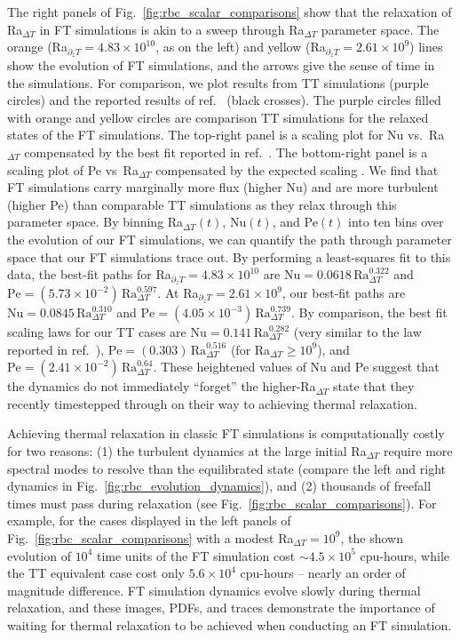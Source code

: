 \documentclass[aps, pre, onecolumn, nofootinbib, notitlepage, groupedaddress, amsfonts, amssymb, amsmath, longbibliography, superscriptaddress]{revtex4-1}
\newcommand{\ea}[1]{{\color{red} #1}}
\begin{document}
The right panels of Fig.~\ref{fig:rbc_scalar_comparisons} show that the relaxation of Ra$_{\Delta T}$ in FT simulations is akin to a sweep through Ra$_{\Delta T}$ parameter space.
The orange (Ra$_{\partial_z T} = 4.83 \times 10^{10}$, as on the left) and yellow (Ra$_{\partial_z T} = 2.61 \times 10^{9}$) lines show the evolution of FT simulations, and the arrows give the sense of time in the simulations.
For comparison, we plot results from TT simulations (purple circles) and the reported results of ref.~\cite{zhu&all2018} (black crosses).
The purple circles filled with orange and yellow circles are comparison TT simulations for the relaxed states of the FT simulations.
The top-right panel is a scaling plot for Nu vs.~Ra$_{\Delta T}$ compensated by the best fit reported in ref.~\cite{johnston&doering2009}.
The bottom-right panel is a scaling plot of Pe vs~Ra$_{\Delta T}$ compensated by the expected scaling \cite{ahlers&all2009}.
We find that FT simulations carry marginally more flux (higher Nu) and are more turbulent (higher Pe) than comparable TT simulations as they relax through this parameter space.
\ea{By binning Ra$_{\Delta T}(t)$, Nu$(t)$, and Pe$(t)$ into ten bins over the evolution of our FT simulations, we can quantify the path through parameter space that our FT simulations trace out.
By performing a least-squares fit to this data, the best-fit paths for Ra$_{\partial_z T} = 4.83 \times 10^{10}$ are $\text{Nu} = 0.0618\,\text{Ra}_{\Delta T}^{0.322}$ and $\text{Pe} = (5.73 \times 10^{-2})\,\text{Ra}_{\Delta T}^{0.597}$.
At Ra$_{\partial_z T} = 2.61 \times 10^{9}$, our best-fit paths are $\text{Nu} = 0.0845\,\text{Ra}_{\Delta T}^{0.310}$ and $\text{Pe} = (4.05 \times 10^{-3})\,\text{Ra}_{\Delta T}^{0.739}$.
By comparison, the best fit scaling laws for our TT cases are $\text{Nu} = 0.141\,\text{Ra}_{\Delta T}^{0.282}$ (very similar to the law reported in ref.~\cite{johnston&doering2009}), $\text{Pe} = (0.303)\,\text{Ra}_{\Delta T}^{0.516}$ (for Ra$_{\Delta T} \geq 10^9$), and $\text{Pe} = (2.41 \times 10^{-2})\,\text{Ra}_{\Delta T}^{0.64}$.
}
These heightened values of Nu and Pe suggest that the dynamics do not immediately ``forget'' the higher-Ra$_{\Delta T}$ state that they recently timestepped through on their way to achieving thermal relaxation.

Achieving thermal relaxation in \ea{classic} FT simulations is computationally costly for two reasons: (1) the turbulent dynamics at the large initial Ra$_{\Delta T}$ require more spectral modes to resolve than the equilibrated state (compare the left and right dynamics in Fig.~\ref{fig:rbc_evolution_dynamics}), and (2) thousands of freefall times must pass during relaxation (see Fig.~\ref{fig:rbc_scalar_comparisons}).
For example, for the cases displayed in the left panels of Fig.~\ref{fig:rbc_scalar_comparisons} with a modest Ra$_{\Delta T} = 10^9$, the shown evolution of $10^4$ time units of the FT simulation cost $\sim 4.5 \times 10^5$ cpu-hours, while the TT equivalent case cost only $5.6 \times 10^4$ cpu-hours -- nearly an order of magnitude difference.
FT simulation dynamics evolve slowly during thermal relaxation, and these images, PDFs, and traces demonstrate the importance of waiting for thermal relaxation to be achieved when conducting an FT simulation.
\end{document}
